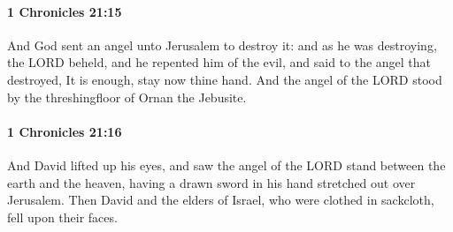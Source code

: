 		\paragraph{1 Chronicles 21:15} %
			\label{1CHRONICLES-21-15}

			And God sent an angel unto Jerusalem to destroy it: and as he was destroying, the LORD beheld, and he repented him of the evil, and said to the angel that destroyed, It is enough, stay now thine hand. And the angel of the LORD stood by the threshingfloor of Ornan the Jebusite.


		\paragraph{1 Chronicles 21:16} %
			\label{1CHRONICLES-21-16}

			And David lifted up his eyes, and saw the angel of the LORD stand between the earth and the heaven, having a drawn sword in his hand stretched out over Jerusalem. Then David and the elders of Israel, who were clothed in sackcloth, fell upon their faces.

